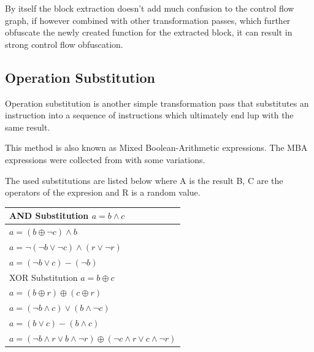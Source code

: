 By itself the block extraction doesn't add much confusion to the control flow graph, if however combined with
other transformation passes, which further obfuscate the newly created function for the extracted block, it can result
in strong control flow obfuscation.

\subsection{Operation Substitution}

Operation substitution is another simple transformation pass that substitutes an instruction into a sequence
of instructions which ultimately end lup with the same result.

This method is also known as Mixed Boolean-Arithmetic expressions. The MBA expressions were collected from \cite{ollvm, mba-exp} with
some variations.

The used substitutions are listed below where A is the result B, C are the operators of the expresion and R is
a random value.

\begin{center}
\begin{tabular}{|l|}
  \hline
  AND Substitution $a = b \land c$ \\
  \hline
  $a = (b \oplus \neg c) \land b$ \\
  $a = \neg(\neg b \lor \neg c) \land (r \lor \neg r)$ \\
  $a = (\neg b \lor c) - (\neg b)$ \\
  \hline
  XOR Substitution $a = b \oplus c$ \\
  \hline
  $a = (b \oplus r) \oplus (c \oplus r)$\\
  $a = (\neg b \land c) \lor (b \land \neg c)$\\
  $a = (b \lor c) - (b \land c)$\\
  $a = (\neg b \land r \lor b \land \neg r) \oplus (\neg c \land r \lor c \land \neg r)$\\
  \hline
\end{tabular}
\end{center}

